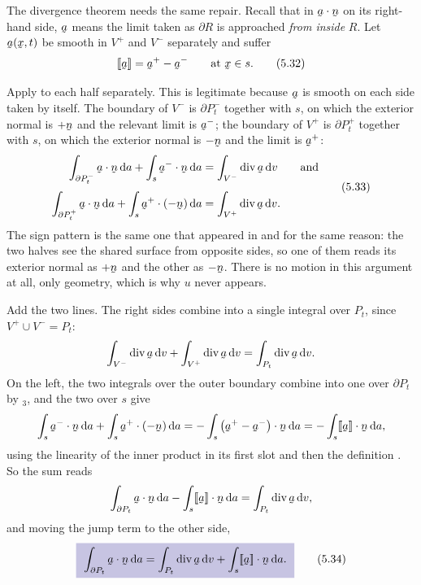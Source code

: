 The divergence theorem  needs the same repair. Recall that in
$\ip\ba\bn$ on its right-hand side, $\ba$ means the limit taken as
$\partial R$ is approached \emph{from inside} $R$. Let $\ba(\bx,t)$ be
smooth in $V^{+}$ and $V^{-}$ separately and suffer
\begin{equation}
   \jump\ba=\ba^{+}-\ba^{-}\qquad\text{at }\bx\in s .
   \tag{5.32}\label{eq:5.32}
\end{equation}

Apply  to each half separately. This is legitimate because
$\ba$ is smooth on each side taken by itself. The boundary of $V^{-}$ is $\partial P^{-}_{t}$ together
with $s$, on which the exterior normal is $+\bn$ and the relevant limit is
$\ba^{-}$; the boundary of $V^{+}$ is $\partial P^{+}_{t}$ together with
$s$, on which the exterior normal is $-\bn$ and the limit is $\ba^{+}$:
\begin{equation}
\begin{aligned}
   \int_{\partial P^{-}_{t}}\ip\ba\bn\,\dl a
   +\int_{s}\ip{\ba^{-}}\bn\,\dl a
   &=\int_{V^{-}}\dvg\ba\,\dl v
   \qquad\text{and}\\[1mm]
   \int_{\partial P^{+}_{t}}\ip\ba\bn\,\dl a
   +\int_{s}\ip{\ba^{+}}{(-\bn)}\,\dl a
   &=\int_{V^{+}}\dvg\ba\,\dl v .
\end{aligned}
   \tag{5.33}\label{eq:5.33}
\end{equation}
The sign pattern is the same one that appeared in  and for the
same reason: the two halves see the shared surface from opposite sides, so
one of them reads its exterior normal as $+\bn$ and the other as $-\bn$.
There is no motion in this argument at all, only geometry, which is why
$u$ never appears.

Add the two lines. The right sides combine into a single integral over
$P_{t}$, since $V^{+}\cup V^{-}=P_{t}$:
\[
   \int_{V^{-}}\dvg\ba\,\dl v+\int_{V^{+}}\dvg\ba\,\dl v
   =\int_{P_{t}}\dvg\ba\,\dl v .
\]
On the left, the two integrals over the outer boundary combine into one
over $\partial P_{t}$ by $_{3}$, and the two over $s$ give
\[
   \int_{s}\ip{\ba^{-}}\bn\,\dl a+\int_{s}\ip{\ba^{+}}{(-\bn)}\,\dl a
   =-\int_{s}\ip{\big(\ba^{+}-\ba^{-}\big)}\bn\,\dl a
   =-\int_{s}\ip{\jump\ba}\bn\,\dl a ,
\]
using the linearity of the inner product in its first slot and then the
definition . So the sum reads
\[
   \int_{\partial P_{t}}\ip\ba\bn\,\dl a-\int_{s}\ip{\jump\ba}\bn\,\dl a
   =\int_{P_{t}}\dvg\ba\,\dl v ,
\]
and moving the jump term to the other side,
\begin{equation}
   \boxed{\ \int_{\partial P_{t}}\ip\ba\bn\,\dl a
   =\int_{P_{t}}\dvg\ba\,\dl v
   +\int_{s}\ip{\jump\ba}\bn\,\dl a .\ }
   \tag{5.34}\label{eq:5.34}
\end{equation}

